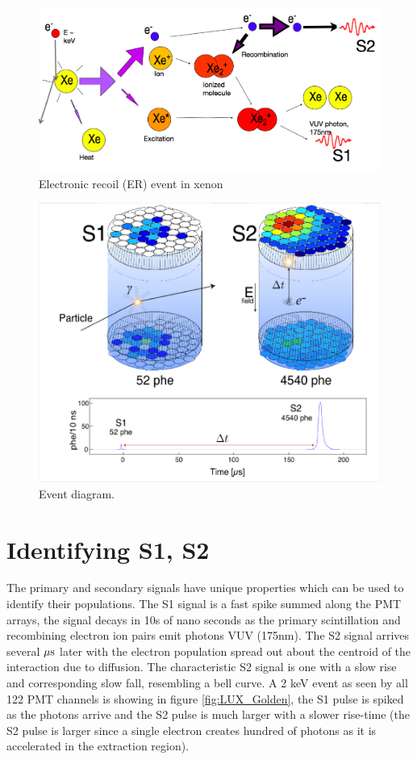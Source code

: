  \begin{figure}[h!]\centering
\includegraphics[width=150mm]{Chapter_LUX_Det/ER_T_Shutt.png}
\caption{Electronic recoil (ER) event in xenon}
\label{fig:TomS_NR}
\end{figure}

 \begin{figure}[h!]\centering
\includegraphics[width=150mm]{Chapter_LUX_Det/LUX_Event_Diagram.png}
\caption{Event diagram.}
\label{fig:LUX_Event}
\end{figure}

\section{Identifying S1, S2}
The primary and secondary signals have unique properties which can be used to identify their populations. The S1 signal is a fast spike summed along the PMT arrays, the signal decays in 10s of nano seconds as the primary scintillation and recombining electron ion pairs emit photons VUV (175nm). The S2 signal arrives several $\rm \mu s$ later with the electron population spread out about the centroid of the interaction due to diffusion. The characteristic S2 signal is one with a slow rise and corresponding slow fall, resembling a bell curve. A 2 keV event as seen by all 122 PMT channels is showing in figure \ref{fig:LUX_Golden}, the S1 pulse is spiked as the photons arrive and the S2 pulse is much larger with a slower rise-time  (the S2 pulse is larger since a single electron creates hundred of photons as it is accelerated in the extraction region). 

